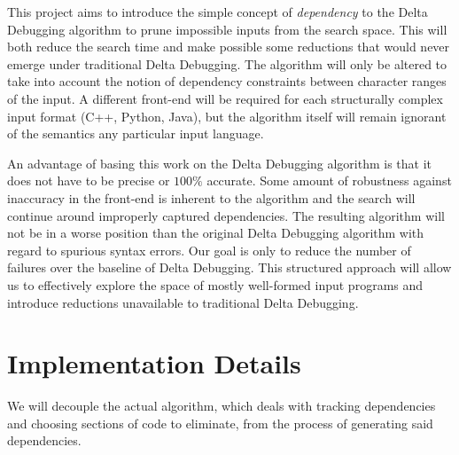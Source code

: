 \documentclass[11pt]{article}
\begin{document}
This project aims to introduce the simple concept of \emph{dependency} to the
Delta Debugging algorithm to prune impossible inputs from the search space.
This will both reduce the search time and make possible some reductions that
would never emerge under traditional Delta Debugging. The algorithm will only be
altered to take into account the notion of dependency constraints between
character ranges of the input. A different front-end will be required for each
structurally complex input format (C++, Python, Java), but the algorithm itself
will remain ignorant of the semantics any particular input language.

An advantage of basing this work on the Delta Debugging algorithm is that it
does not have to be precise or $100 \%$ accurate. Some amount of robustness
against inaccuracy in the front-end is inherent to the algorithm and the search
will continue around improperly captured dependencies.  The resulting algorithm
will not be in a worse position than the original Delta Debugging algorithm with
regard to spurious syntax errors.  Our goal is only to reduce the number of
failures over the baseline of Delta Debugging. This structured approach will
allow us to effectively explore the space of mostly well-formed input programs
and introduce reductions unavailable to traditional Delta Debugging.


\section{Implementation Details}
We will decouple the actual algorithm, which deals with tracking dependencies
and choosing sections of code to eliminate, from the process of generating said
dependencies.
\end{document}
